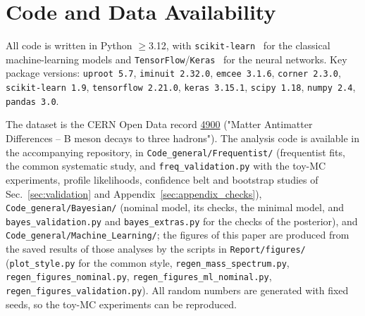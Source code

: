 \section{Code and Data Availability}
\label{sec:code}
All code is written in Python $\geq$3.12, with \texttt{scikit-learn}~\cite{sklearn} for the classical machine-learning models and \texttt{TensorFlow}/\texttt{Keras}~\cite{tensorflow} for the neural networks. Key package versions: \texttt{uproot 5.7}, \texttt{iminuit 2.32.0}, \texttt{emcee 3.1.6}, \texttt{corner 2.3.0}, \texttt{scikit-learn 1.9}, \texttt{tensorflow 2.21.0}, \texttt{keras 3.15.1}, \texttt{scipy 1.18}, \texttt{numpy 2.4}, \texttt{pandas 3.0}.

The dataset is the CERN Open Data record \href{https://opendata.cern.ch/record/4900}{4900} ("Matter Antimatter Differences -- B meson decays to three hadrons"). The analysis code is available in the accompanying repository, in \texttt{Code\_general/Frequentist/} (frequentist fits, the common systematic study, and \texttt{freq\_validation.py} with the toy-MC experiments, profile likelihoods, confidence belt and bootstrap studies of Sec.~\ref{sec:validation} and Appendix~\ref{sec:appendix_checks}), \texttt{Code\_general/Bayesian/} (nominal model, its checks, the minimal model, and \texttt{bayes\_validation.py} and \texttt{bayes\_extras.py} for the checks of the posterior), and \texttt{Code\_general/Machine\_Learning/}; the figures of this paper are produced from the saved results of those analyses by the scripts in \texttt{Report/figures/} (\texttt{plot\_style.py} for the common style, \texttt{regen\_mass\_spectrum.py}, \texttt{regen\_figures\_nominal.py}, \texttt{regen\_figures\_ml\_nominal.py}, \texttt{regen\_figures\_validation.py}). All random numbers are generated with fixed seeds, so the toy-MC experiments can be reproduced.

